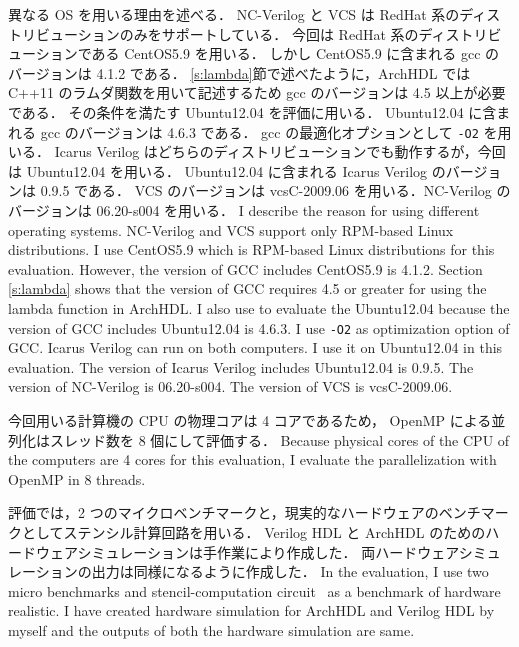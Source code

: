 異なる OS を用いる理由を述べる．
NC-Verilog と VCS は RedHat 系のディストリビューションのみをサポートしている．
今回は RedHat 系のディストリビューションである CentOS5.9 を用いる．
しかし CentOS5.9 に含まれる gcc のバージョンは 4.1.2 である．
\ref{s:lambda}節で述べたように，ArchHDL では C++11 のラムダ関数を用いて記述するため gcc のバージョンは 4.5 以上が必要である．
その条件を満たす Ubuntu12.04 を評価に用いる．
Ubuntu12.04 に含まれる gcc のバージョンは 4.6.3 である．
gcc の最適化オプションとして \verb/-O2/ を用いる．
Icarus Verilog はどちらのディストリビューションでも動作するが，今回は Ubuntu12.04 を用いる．
Ubuntu12.04 に含まれる Icarus Verilog のバージョンは 0.9.5 である．
VCS のバージョンは vcsC-2009.06 を用いる．NC-Verilog のバージョンは 06.20-s004 を用いる．
\fi
I describe the reason for using different operating systems.
NC-Verilog and VCS support only RPM-based Linux distributions.
I use CentOS5.9 which is RPM-based Linux distributions for this evaluation.
However, the version of GCC includes CentOS5.9 is 4.1.2.
Section \ref{s:lambda} shows that the version of GCC requires 4.5 or greater for using the lambda function in ArchHDL.
I also use to evaluate the Ubuntu12.04 because the version of GCC includes Ubuntu12.04 is 4.6.3.
I use \verb/-O2/ as optimization option of GCC.
Icarus Verilog can run on both computers.
I use it on Ubuntu12.04 in this evaluation.
The version of Icarus Verilog includes Ubuntu12.04 is 0.9.5.
The version of NC-Verilog is 06.20-s004.
The version of VCS is vcsC-2009.06.

今回用いる計算機の CPU の物理コアは 4 コアであるため， OpenMP による並列化はスレッド数を 8 個にして評価する．
\fi
Because physical cores of the CPU of the computers are 4 cores for this evaluation,
I evaluate the parallelization with OpenMP in 8 threads.

評価では，2 つのマイクロベンチマークと，現実的なハードウェアのベンチマークとしてステンシル計算回路\cite{koba:stencil}を用いる．
Verilog HDL と ArchHDL のためのハードウェアシミュレーションは手作業により作成した．
両ハードウェアシミュレーションの出力は同様になるように作成した．
\fi
In the evaluation, I use two micro benchmarks
and stencil-computation circuit~\cite{koba:stencil} as a benchmark of hardware realistic.
I have created hardware simulation for ArchHDL and Verilog HDL by myself
and the outputs of both the hardware simulation are same.

